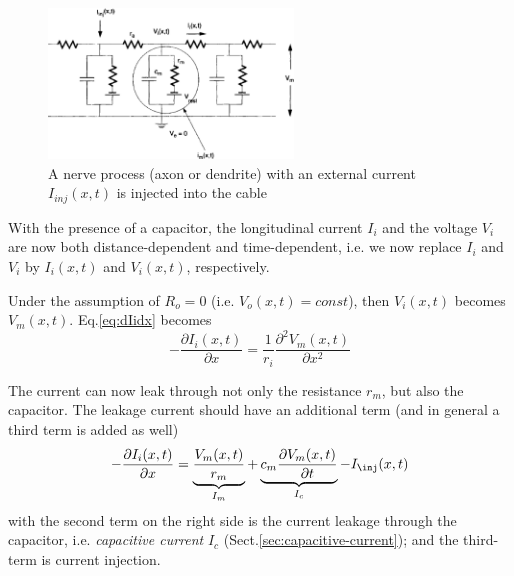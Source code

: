 

\begin{figure}[htb]
\centerline{\includegraphics[height=4cm]{./images/membrane_RC-model.eps}}
\caption{A nerve process (axon or dendrite) with an
external current $I_{inj}(x,t)$ is injected into the cable}\label{fig:cylinder}
\end{figure} 

With the presence of a capacitor, the longitudinal current $I_i$ and the voltage
$V_i$ are now both distance-dependent and time-dependent, i.e.  we now replace
$I_i$ and $V_i$ by $I_i(x,t)$ and $V_i(x,t)$, respectively. 

Under the assumption of $R_o = 0$ (i.e. $V_o(x,t) = const$), then $V_i(x,t)$
becomes $V_m(x,t)$. Eq.\ref{eq:dIidx} becomes
\begin{equation}
  \label{eq:dIidx_capacitor}
  -\frac{\partial I_i(x,t)}{\partial x} =  \frac{1}{r_i}\frac{\partial
  ^2V_m(x,t)}{\partial x^2}
\end{equation} 

% 

The current can now leak through not only the
resistance $r_m$, but also the capacitor.  The leakage
current should have an additional term (and in general a third term is added as well)
\begin{equation}
\label{eq:dIidx_active}
-\frac{\partial I_i(x,t)}{\partial x} = \underbrace{\frac{V_m(x,t)}{r_m}}_{I_m}
+ \underbrace{c_m
\frac{\partial V_m(x,t)}{\partial t}}_{I_c} - I_\inj(x,t)
\end{equation}
with the second term on the right side is the current leakage through the
capacitor, i.e. {\it capacitive current}
$I_c$ (Sect.\ref{sec:capacitive-current}); and the third-term is current
injection.

